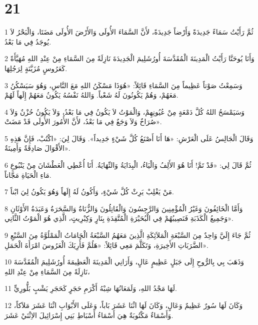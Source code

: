 \chapter{21}

\par 1 ثُمَّ رَأَيْتُ سَمَاءً جَدِيدَةً وَأَرْضاً جَدِيدَةً، لأَنَّ السَّمَاءَ الأُولَى وَالأَرْضَ الأُولَى مَضَتَا، وَالْبَحْرُ لاَ يُوجَدُ فِي مَا بَعْدُ.
\par 2 وَأَنَا يُوحَنَّا رَأَيْتُ الْمَدِينَةَ الْمُقَدَّسَةَ أُورُشَلِيمَ الْجَدِيدَةَ نَازِلَةً مِنَ السَّمَاءِ مِنْ عِنْدِ اللهِ مُهَيَّأَةً كَعَرُوسٍ مُزَيَّنَةٍ لِرَجُلِهَا.
\par 3 وَسَمِعْتُ صَوْتاً عَظِيماً مِنَ السَّمَاءِ قَائِلاً: «هُوَذَا مَسْكَنُ اللهِ مَعَ النَّاسِ، وَهُوَ سَيَسْكُنُ مَعَهُمْ، وَهُمْ يَكُونُونَ لَهُ شَعْباً. وَاللهُ نَفْسُهُ يَكُونُ مَعَهُمْ إِلَهاً لَهُمْ.
\par 4 وَسَيَمْسَحُ اللهُ كُلَّ دَمْعَةٍ مِنْ عُيُونِهِمْ، وَالْمَوْتُ لاَ يَكُونُ فِي مَا بَعْدُ، وَلاَ يَكُونُ حُزْنٌ وَلاَ صُرَاخٌ وَلاَ وَجَعٌ فِي مَا بَعْدُ، لأَنَّ الأُمُورَ الأُولَى قَدْ مَضَتْ».
\par 5 وَقَالَ الْجَالِسُ عَلَى الْعَرْشِ: «هَا أَنَا أَصْنَعُ كُلَّ شَيْءٍ جَدِيداً». وَقَالَ لِيَ: «اكْتُبْ، فَإِنَّ هَذِهِ الأَقْوَالَ صَادِقَةٌ وَأَمِينَةٌ».
\par 6 ثُمَّ قَالَ لِي: «قَدْ تَمَّ! أَنَا هُوَ الأَلِفُ وَالْيَاءُ، الْبِدَايَةُ وَالنِّهَايَةُ. أَنَا أُعْطِي الْعَطْشَانَ مِنْ يَنْبُوعِ مَاءِ الْحَيَاةِ مَجَّاناً.
\par 7 مَنْ يَغْلِبْ يَرِثْ كُلَّ شَيْءٍ، وَأَكُونُ لَهُ إِلَهاً وَهُوَ يَكُونُ لِيَ ابْناً.
\par 8 وَأَمَّا الْخَائِفُونَ وَغَيْرُ الْمُؤْمِنِينَ وَالرَّجِسُونَ وَالْقَاتِلُونَ وَالزُّنَاةُ وَالسَّحَرَةُ وَعَبَدَةُ الأَوْثَانِ وَجَمِيعُ الْكَذَبَةِ فَنَصِيبُهُمْ فِي الْبُحَيْرَةِ الْمُتَّقِدَةِ بِنَارٍ وَكِبْرِيتٍ، الَّذِي هُوَ الْمَوْتُ الثَّانِي».
\par 9 ثُمَّ جَاءَ إِلَيَّ وَاحِدٌ مِنَ السَّبْعَةِ الْمَلاَئِكَةِ الَّذِينَ مَعَهُمُ السَّبْعَةُ الْجَامَاتُ الْمَمْلُوَّةُ مِنَ السَّبْعِ الضَّرَبَاتِ الأَخِيرَةِ، وَتَكَلَّمَ مَعِي قَائِلاً: «هَلُمَّ فَأُرِيَكَ الْعَرُوسَ امْرَأَةَ الْحَمَلِ».
\par 10 وَذَهَبَ بِي بِالرُّوحِ إِلَى جَبَلٍ عَظِيمٍ عَالٍ، وَأَرَانِي الْمَدِينَةَ الْعَظِيمَةَ أُورُشَلِيمَ الْمُقَدَّسَةَ نَازِلَةً مِنَ السَّمَاءِ مِنْ عِنْدِ اللهِ،
\par 11 لَهَا مَجْدُ اللهِ، وَلَمَعَانُهَا شِبْهُ أَكْرَمِ حَجَرٍ كَحَجَرِ يَشْبٍ بَلُّورِيٍّ.
\par 12 وَكَانَ لَهَا سُورٌ عَظِيمٌ وَعَالٍ، وَكَانَ لَهَا اثْنَا عَشَرَ بَاباً، وَعَلَى الأَبْوَابِ اثْنَا عَشَرَ مَلاَكاً، وَأَسْمَاءٌ مَكْتُوبَةٌ هِيَ أَسْمَاءُ أَسْبَاطِ بَنِي إِسْرَائِيلَ الاِثْنَيْ عَشَرَ.
